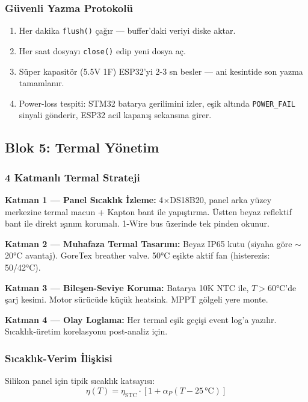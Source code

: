 \documentclass[11pt,a4paper]{article}
\begin{document}
\subsubsection{Güvenli Yazma Protokolü}

\begin{enumerate}
    \item Her dakika \texttt{flush()} çağır --- buffer'daki veriyi diske aktar.
    \item Her saat dosyayı \texttt{close()} edip yeni dosya aç.
    \item Süper kapasitör (5.5V 1F) ESP32'yi 2-3 sn besler --- ani kesintide son yazma tamamlanır.
    \item Power-loss tespiti: STM32 batarya gerilimini izler, eşik altında \texttt{POWER\_FAIL} sinyali gönderir, ESP32 acil kapanış sekansına girer.
\end{enumerate}

\subsection{Blok 5: Termal Yönetim}

\subsubsection{4 Katmanlı Termal Strateji}

\textbf{Katman 1 --- Panel Sıcaklık İzleme:} 4$\times$DS18B20, panel arka yüzey merkezine termal macun + Kapton bant ile yapıştırma. Üstten beyaz reflektif bant ile direkt ışınım korumalı. 1-Wire bus üzerinde tek pinden okunur.

\textbf{Katman 2 --- Muhafaza Termal Tasarımı:} Beyaz IP65 kutu (siyaha göre $\sim$20°C avantaj). GoreTex breather valve. 50°C eşikte aktif fan (histerezis: 50/42°C).

\textbf{Katman 3 --- Bileşen-Seviye Koruma:} Batarya 10K NTC ile, $T > 60$°C'de şarj kesimi. Motor sürücüde küçük heatsink. MPPT gölgeli yere monte.

\textbf{Katman 4 --- Olay Loglama:} Her termal eşik geçişi event log'a yazılır. Sıcaklık-üretim korelasyonu post-analiz için.

\subsubsection{Sıcaklık-Verim İlişkisi}

Silikon panel için tipik sıcaklık katsayısı:
\begin{equation}
\eta(T) = \eta_{\text{STC}} \cdot \left[1 + \alpha_P (T - 25\,°\text{C})\right]
\end{equation}
\end{document}
